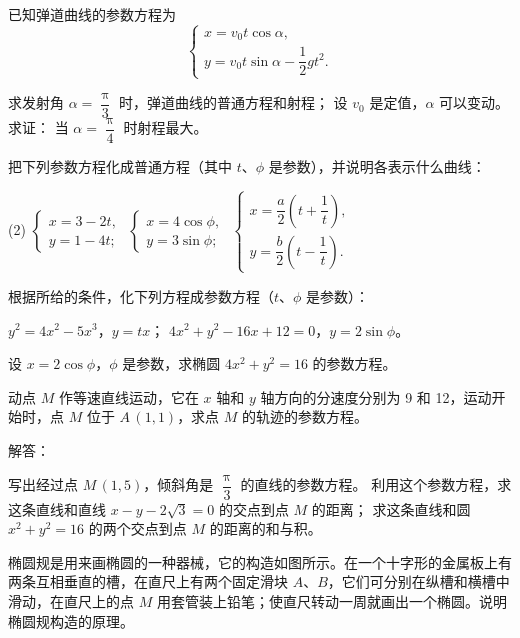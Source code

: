 \begin{Exercise}
  \begin{question}
    \item 已知弹道曲线的参数方程为
    \[\begin{cases}x=v_0t\cos\alpha,\\y=v_0t\sin\alpha-\dfrac{1}{2}gt^2.\end{cases}\]
    \begin{tasks}
      \task 求发射角 $\alpha = \dfrac{\uppi}{3}$ 时，弹道曲线的普通方程和射程；
      \task 设 $v_0$ 是定值，$\alpha$ 可以变动。求证： 当 $\alpha=\dfrac{\uppi}{4}$ 时射程最大。
    \end{tasks}
    \item 把下列参数方程化成普通方程（其中 $t$、$\phi$ 是参数），并说明各表示什么曲线：
    \begin{tasks}(2)
      \task $\begin{cases}x=3-2t,\\y=1-4t;\end{cases}$
      \task $\begin{cases}x=4\cos\phi,\\y=3\sin\phi;\end{cases}$
      \task $\begin{cases}x=\dfrac{a}{2}\left(t+\dfrac{1}{t}\right),\\y=\dfrac{b}{2}\left(t-\dfrac{1}{t}\right).\end{cases}$
    \end{tasks}
    \item 根据所给的条件，化下列方程成参数方程（$t$、$\phi$ 是参数）：
    \begin{tasks}
      \task $y^2=4x^2-5x^3$，$y=tx$；
      \task $4x^2+y^2-16x+12=0$，$y=2\sin\phi$。
    \end{tasks}
    \item 设 $x=2\cos\phi$，$\phi$ 是参数，求椭圆 $4x^2+y^2=16$ 的参数方程。
    \item 动点 $M$ 作等速直线运动，它在 $x$ 轴和 $y$ 轴方向的分速度分别为 9 和 12，运动开始时，点 $M$ 位于 $A\,(1,1)$，求点 $M$ 的轨迹的参数方程。
    \item 解答：
    \begin{tasks}
      \task 写出经过点 $M\,(1,5)$，倾斜角是 $\dfrac{\uppi}{3}$ 的直线的参数方程。
      \task 利用这个参数方程，求这条直线和直线 $x-y-2\sqrt{3}=0$ 的交点到点 $M$ 的距离；
      \task 求这条直线和圆 $x^2+y^2=16$ 的两个交点到点 $M$ 的距离的和与积。
    \end{tasks}
    \item\label{exec:13-7} 椭圆规是用来画椭圆的一种器械，它的构造如图所示。在一个十字形的金属板上有两条互相垂直的槽，在直尺上有两个固定滑块 $A$、$B$，它们可分别在纵槽和横槽中滑动，在直尺上的点 $M$ 用套管装上铅笔；使直尺转动一周就画出一个椭圆。说明椭圆规构造的原理。

\end{question}
\end{Exercise}
